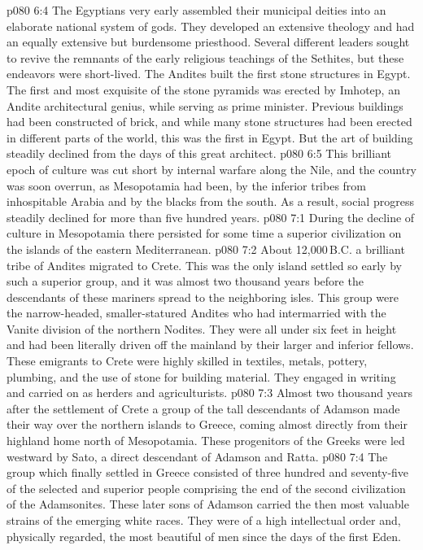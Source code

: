 \vs p080 6:4 \pc The Egyptians very early assembled their municipal deities into an elaborate national system of gods. They developed an extensive theology and had an equally extensive but burdensome priesthood. Several different leaders sought to revive the remnants of the early religious teachings of the Sethites, but these endeavors were short\hyp{}lived. The Andites built the first stone structures in Egypt. The first and most exquisite of the stone pyramids was erected by Imhotep, an Andite architectural genius, while serving as prime minister. Previous buildings had been constructed of brick, and while many stone structures had been erected in different parts of the world, this was the first in Egypt. But the art of building steadily declined from the days of this great architect.
\vs p080 6:5 This brilliant epoch of culture was cut short by internal warfare along the Nile, and the country was soon overrun, as Mesopotamia had been, by the inferior tribes from inhospitable Arabia and by the blacks from the south. As a result, social progress steadily declined for more than five hundred years.
\vs p080 7:1 During the decline of culture in Mesopotamia there persisted for some time a superior civilization on the islands of the eastern Mediterranean.
\vs p080 7:2 About 12,000\,B.C. a brilliant tribe of Andites migrated to Crete. This was the only island settled so early by such a superior group, and it was almost two thousand years before the descendants of these mariners spread to the neighboring isles. This group were the narrow\hyp{}headed, smaller\hyp{}statured Andites who had intermarried with the Vanite division of the northern Nodites. They were all under six feet in height and had been literally driven off the mainland by their larger and inferior fellows. These emigrants to Crete were highly skilled in textiles, metals, pottery, plumbing, and the use of stone for building material. They engaged in writing and carried on as herders and agriculturists.
\vs p080 7:3 Almost two thousand years after the settlement of Crete a group of the tall descendants of Adamson made their way over the northern islands to Greece, coming almost directly from their highland home north of Mesopotamia. These progenitors of the Greeks were led westward by Sato, a direct descendant of Adamson and Ratta.
\vs p080 7:4 The group which finally settled in Greece consisted of three hundred and seventy\hyp{}five of the selected and superior people comprising the end of the second civilization of the Adamsonites. These later sons of Adamson carried the then most valuable strains of the emerging white races. They were of a high intellectual order and, physically regarded, the most beautiful of men since the days of the first Eden.
